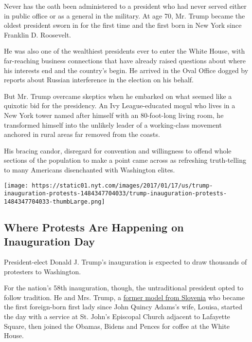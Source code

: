 Never has the oath been administered to a president who had never served
either in public office or as a general in the military. At age 70, Mr.
Trump became the oldest president sworn in for the first time and the
first born in New York since Franklin D. Roosevelt.

He was also one of the wealthiest presidents ever to enter the White
House, with far-reaching business connections that have already raised
questions about where his interests end and the country's begin. He
arrived in the Oval Office dogged by reports about Russian interference
in the election on his behalf.

But Mr. Trump overcame skeptics when he embarked on what seemed like a
quixotic bid for the presidency. An Ivy League-educated mogul who lives
in a New York tower named after himself with an 80-foot-long living
room, he transformed himself into the unlikely leader of a working-class
movement anchored in rural areas far removed from the coasts.

His bracing candor, disregard for convention and willingness to offend
whole sections of the population to make a point came across as
refreshing truth-telling to many Americans disenchanted with Washington
elites.

\href{https://www.nytimes.com/interactive/2017/01/17/us/inauguration-protests.html}{}

\texttt{[image: https://static01.nyt.com/images/2017/01/17/us/trump-inauguration-protests-1484347704033/trump-inauguration-protests-1484347704033-thumbLarge.png]}

\hypertarget{where-protests-are-happening-on-inauguration-day}{%
\subsection{Where Protests Are Happening on Inauguration
Day}\label{where-protests-are-happening-on-inauguration-day}}

President-elect Donald J. Trump's inauguration is expected to draw
thousands of protesters to Washington.

For the nation's 58th inauguration, though, the untraditional president
opted to follow tradition. He and Mrs. Trump, a
\href{https://www.nytimes.com/2016/07/19/us/politics/melania-trump-slovenia.html}{former
model from Slovenia} who became the first foreign-born first lady since
John Quincy Adams's wife, Louisa, started the day with a service at St.
John's Episcopal Church adjacent to Lafayette Square, then joined the
Obamas, Bidens and Pences for coffee at the White House.

